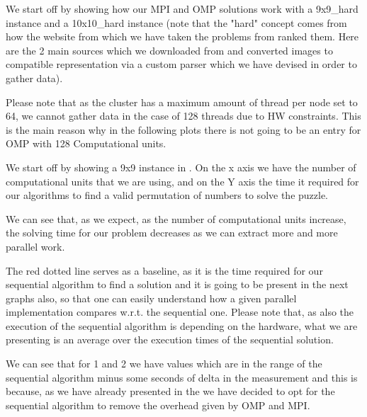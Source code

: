 We start off by showing how our MPI and OMP solutions work with a 9x9\_hard instance and a 10x10\_hard instance (note that the "hard" concept comes from how the website from which we have taken the problems from ranked them. Here are the 2 main sources which we downloaded from \cite{puzzle_futoshiki,puddelbee} and converted images to compatible representation via a custom parser which we have devised in order to gather data).

Please note that as the cluster has a maximum amount of thread per node set to 64, we cannot gather data in the case of 128 threads due to HW constraints. This is the main reason why in the following plots there is not going to be an entry for OMP with 128 Computational units.


We start off by showing a 9x9 instance in . On the x axis we have the number of computational units that we are using, and on the Y axis the time it required for our algorithms to find a valid permutation of numbers to solve the puzzle.

We can see that, as we expect, as the number of computational units increase, the solving time for our problem decreases as we can extract more and more parallel work.

The red dotted line serves as a baseline, as it is the time required for our sequential algorithm to find a solution and it is going to be present in the next graphs also, so that one can easily understand how a given parallel implementation compares w.r.t. the sequential one. Please note that, as also the execution of the sequential algorithm is depending on the hardware, what we are presenting is an average over the execution times of the sequential solution.


We can see that for 1 and 2 we have values which are in the range of the sequential algorithm minus some seconds of delta in the measurement and this is because, as we have already presented in the  we have decided to opt for the sequential algorithm to remove the overhead given by OMP and MPI.

